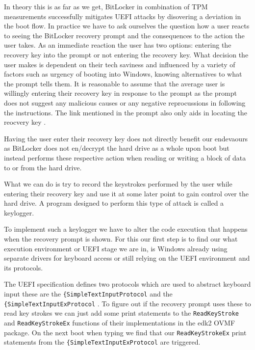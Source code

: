 In theory this is as far as we get, BitLocker in combination of TPM measurements successfully mitigates UEFI attacks by disovering a deviation in the boot flow.
In practice we have to ask ourselves the question how a user reacts to seeing the BitLocker recovery prompt and the consequences to the action the user takes. As an immediate reaction the user has two options: entering the recovery key into the prompt or not entering the recovery key.
What decision the user makes is dependent on their tech saviness and influenced by a variety of factors such as urgency of booting into Windows, knowing alternatives to what the prompt tells them.
It is reasonable to assume that the average user is willingly entering their recovery key in response to the prompt as the prompt does not suggest any malicious causes or any negative reprocussions in following the instructions. The link mentioned in the prompt also only aids in locating the reocvery key \cite{microsoft-recovery-key-faq}.

Having the user enter their recovery key does not directly benefit our endevaours as BitLocker does not en/decrypt the hard drive as a whole upon boot but instead performs these respective action when reading or writing a block of data to or from the hard drive.

What we can do is try to record the keystrokes performed by the user while entering their recovery key and use it at some later point to gain control over the hard drive. A program designed to perform this type of attack is called a keylogger.

To implement such a keylogger we have to alter the code execution that happens when the recovery prompt is shown. For this our first step is to find our what execution environment or UEFI stage we are in, is Windows already using separate drivers for keyboard access or still relying on the UEFI environment and its protocols.

The UEFI specification defines two protocols which are used to abstract keyboard input these are the \lstinline{{SimpleTextInputProtocol} and the \lstinline{{SimpleTextInputExProtocol} \cite[12.2, 12.3]{uefi-spec}. To figure out if the recovery prompt uses these to read key strokes we can just add some print statements to the \lstinline{ReadKeyStroke} and \lstinline{ReadKeyStrokeEx} functions of their implementations in the edk2 OVMF package. On the next boot when typing we find that our \lstinline{ReadKeyStrokeEx} print statements from the \lstinline{{SimpleTextInputExProtocol} are triggered.

